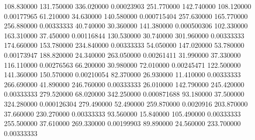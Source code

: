 108.830000	131.750000	336.020000	0.00023903
251.770000	142.740000	108.120000	0.00177965
61.210000	34.630000	140.580000	0.000715404
257.630000	165.770000	256.880000	0.00333333
40.740000	30.360000	141.380000	0.000500306
102.330000	163.310000	37.450000	0.00116844
130.530000	30.740000	301.960000	0.00333333
174.660000	153.780000	234.840000	0.00333333
54.050000	147.020000	53.780000	0.00173947
188.820000	24.340000	263.050000	0.00261411
31.990000	37.330000	116.110000	0.00276563
66.200000	30.980000	72.010000	0.00245471
122.500000	141.360000	150.570000	0.00210054
82.370000	26.930000	11.410000	0.00333333
266.690000	41.890000	246.760000	0.00333333
26.010000	142.790000	245.420000	0.00333333
279.520000	68.020000	342.250000	0.000871688
93.180000	37.500000	324.280000	0.000126304
279.490000	52.490000	259.870000	0.0020916
203.870000	37.660000	230.270000	0.00333333
93.560000	15.840000	105.490000	0.00333333
255.500000	37.610000	269.330000	0.00199903
89.890000	24.560000	233.700000	0.00333333
